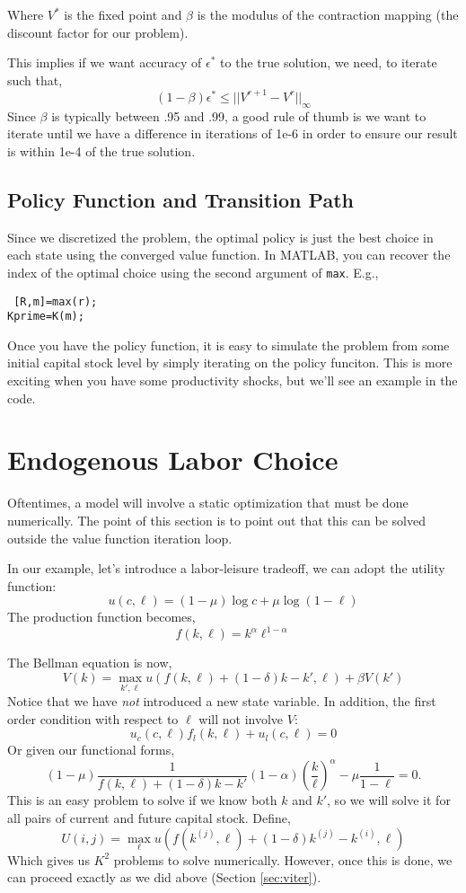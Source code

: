 \documentclass[twoside]{article}
\begin{document}
Where $V^*$ is the fixed point and $\beta$ is the modulus of the contraction mapping (the discount factor for our problem). 

This implies if we want accuracy of $\epsilon^*$ to the true solution, we need, to iterate such that, 
$$(1-\beta) \epsilon^* \leq ||V^{r+1} - V^r||_\infty $$
Since $\beta$ is typically between .95 and .99, a good rule of thumb is we want to iterate until we have a difference in iterations of 1e-6 in order to ensure
our result is within 1e-4 of the true solution.

\subsection{Policy Function and Transition Path}

Since we discretized the problem, the optimal policy is just the best choice in each state using the converged value function. In MATLAB,
you can recover the index of the optimal choice using the second argument of {\tt max}. E.g., 

{\tt
[R,m]=max(r); \\ 
Kprime=K(m);
}

Once you have the policy function, it is easy to simulate the problem from some initial capital stock level by simply iterating on the policy funciton. 
This is more exciting when you have some productivity shocks, but we'll see an example in the code. 

\section{Endogenous Labor Choice}

Oftentimes, a model will involve a static optimization that must be done numerically. The point of this section is to point out that this can be solved
outside the value function iteration loop. 

In our example, let's introduce a labor-leisure tradeoff, we can adopt the utility function: 
$$ u(c, \ell) = (1-\mu) \log c + \mu \log (1-\ell) $$
The production function becomes, 
$$ f(k, \ell) = k^\alpha \ell^{1-\alpha}$$

The Bellman equation is now, 
$$V(k) = \max_{k', \ell} u( f(k, \ell) + (1-\delta) k - k', \ell) + \beta V(k') $$
Notice that we have {\it not} introduced a new state variable. In addition, the first order condition with respect to $\ell$ will not involve $V$:
 $$ u_c(c, \ell) f_l(k, \ell)  + u_l(c, \ell) = 0$$ 
 Or given our functional forms, 
 $$ (1 - \mu) \frac{1}{f(k, \ell) + (1-\delta) k - k'} (1-\alpha) \left(\frac{k}{\ell}\right)^\alpha - \mu \frac{1}{1-\ell} = 0.$$
 This is an easy problem to solve if we know both $k$ and $k'$, so we will solve it for all pairs of current and future capital stock.  
 Define, 
 $$ U(i, j) = \max_\ell u( f(k^{(j)}, \ell) + (1-\delta) k^{(j)} - k^{(i)}, \ell)  $$ 
 Which gives us $K^2$ problems to solve numerically.  However, once this is done, we can proceed exactly as we did above (Section \ref{sec:viter}). 
 
\end{document}
